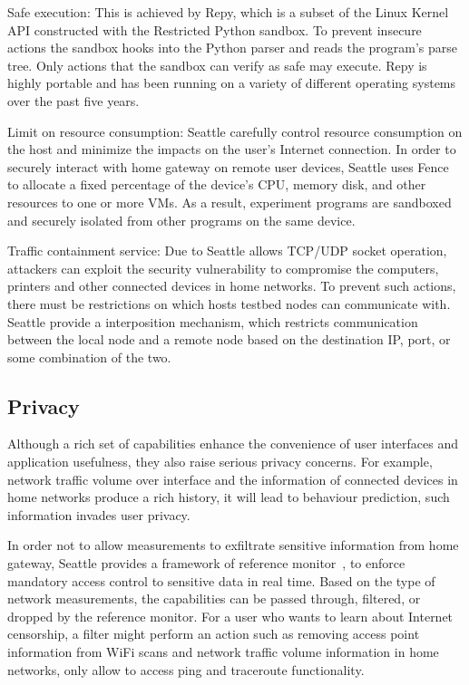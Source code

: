 Safe execution: This is achieved by Repy, which is a subset of the Linux Kernel API 
constructed with the Restricted Python sandbox. To prevent insecure actions 
the sandbox hooks into the Python parser and reads the program's parse tree. 
Only actions that the sandbox can verify as safe may execute. Repy is highly 
portable and has been running on a variety of different operating systems 
over the past five years.

Limit on resource consumption: Seattle carefully control resource 
consumption on the host and minimize the impacts on the user's Internet 
connection. In order to securely interact with home gateway on remote user 
devices, Seattle uses Fence~\cite{li2015fence} to allocate a fixed 
percentage of the device's CPU, memory disk, and other resources to one or 
more VMs. As a result, experiment programs are sandboxed and securely 
isolated from other programs on the same device. 

Traffic containment service: Due to Seattle allows TCP/UDP socket operation, 
attackers can exploit the security vulnerability to compromise the 
computers, printers and other connected devices in home networks. To prevent 
such actions, there must be restrictions on which hosts testbed nodes can 
communicate with. Seattle provide a interposition mechanism, which restricts 
communication between the local node and a remote node based on the 
destination IP, port, or some combination of the two. 

\subsection{Privacy}
Although a rich set of capabilities enhance the convenience of user 
interfaces and application usefulness, they also raise serious privacy 
concerns. For example, network traffic volume over interface and the 
information of connected devices in home networks produce a rich history, it 
will lead to behaviour prediction, such information invades user privacy. 

In order not to allow measurements to exfiltrate sensitive information from 
home gateway, Seattle provides a framework of reference monitor~\cite{ref}, 
to enforce mandatory access control to sensitive data in real time. Based on 
the type of network measurements, the capabilities can be passed through, 
filtered, or dropped by the reference monitor. For a user who wants to learn 
about Internet censorship, a filter might perform an action such as removing 
access point information from WiFi scans and network traffic volume 
information in home networks, only allow to access ping and traceroute 
functionality.
